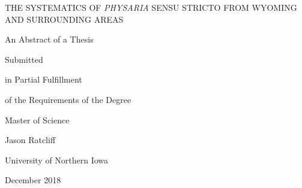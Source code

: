 \clearpage
\thispagestyle{empty}
\begin{center} 
THE SYSTEMATICS OF \textit{PHYSARIA} SENSU STRICTO FROM WYOMING 
AND SURROUNDING AREAS
\end{center}
\vspace*{\fill}
\begin{center}
  An Abstract of a Thesis

  Submitted

  in Partial Fulfillment

  of the Requirements of the Degree
  
  Master of Science
\end{center}
\vspace*{\fill}
\begin{center}
  Jason Ratcliff
  
  University of Northern Iowa
  
  December 2018
\end{center}